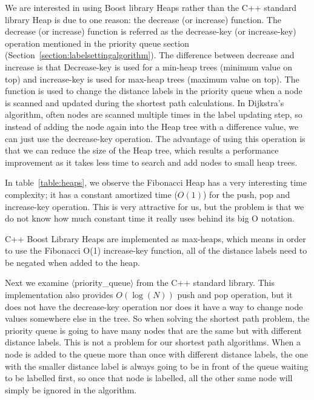 We are interested in using Boost library Heaps rather than the C++ standard library Heap is due to one reason:
the decrease (or increase) function.
The decrease (or increase) function is referred as the decrease-key (or increase-key) operation mentioned in the priority queue section (Section~\ref{section:labelsettingalgorithm}).
The difference between decrease and increase is that Decrease-key is used for a min-heap trees (minimum value on top) and increase-key is used for max-heap trees (maximum value on top).
The function is used to change the distance labels in the priority queue when a node is scanned and updated during the shortest path calculations.
In Dijkstra's algorithm,
often nodes are scanned multiple times in the label updating step,
so instead of adding the node again into the Heap tree with a difference value,
we can just use the decrease-key operation.
The advantage of using this operation is that we can reduce the size of the Heap tree, which results a performance improvement as it takes less time to search and add nodes to small heap trees.

In table~\ref{table:heaps},
we observe the Fibonacci Heap has a very interesting time complexity;
it has a constant amortized time ($O(1)$) for the push, pop and increase-key operation.
This is very attractive for us, but the problem is that
we do not know how much constant time it really uses behind its big O notation.

C++ Boost Library Heaps are implemented as max-heaps,
which means in order to use the Fibonacci O(1) increase-key function,
all of the distance labels need to be negated when added to the heap.

Next we examine $\langle$priority\_queue$\rangle$ from the C++ standard library.
This implementation also provides $O(\log(N))$ push and pop operation,
but it does not have the decrease-key operation nor does it have a way to change node values somewhere else in the tree.
So when solving the shortest path problem,
the priority queue is going to have many nodes that are the same but with different distance labels.
This is not a problem for our shortest path algorithms.
When a node is added to the queue more than once with different distance labels,
the one with the smaller distance label is always going to be in front of the queue waiting to be labelled first,
so once that node is labelled,
all the other same node will simply be ignored in the algorithm.

